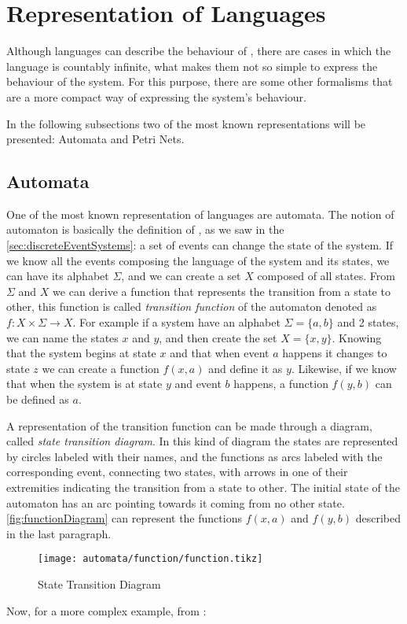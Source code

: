 \section{Representation of Languages}
\label{sec:representationLanguages}

Although languages can describe the behaviour of \DESs, there are cases in which the language is countably infinite, what makes them not so simple to express the
behaviour of the system. For this purpose, there are some other formalisms that
are a more compact way of expressing the
system's behaviour.

In the following subsections two of the most known representations will be
presented: Automata and Petri Nets.

\subsection{Automata}
\label{sec:automata}
One of the most known representation of languages are automata. The notion of
automaton is basically the definition of \DESs, as we saw in the
\autoref{sec:discreteEventSystems}: a set of events can change the state of the
system. If we know all the events composing the language of the
system and its states, we can have its alphabet $\Sigma$, and we can create a set $X$ composed
of all states.
From $\Sigma$ and $X$ we can derive a function that represents the transition
from a state to other, this function is called \emph{transition function} of the automaton
denoted as $f : X \times \Sigma \rightarrow X$. For example if a system have an
alphabet $\Sigma = \{a,b\}$ and 2 states, we can name the states $x$ and
$y$, and then create the set $X = \{x,y\}$. Knowing that the system begins at state $x$
and that when event $a$ happens it changes to state $z$ we can create a function
$f(x,a)$ and define it as $y$. Likewise, if we know that when the system is at
state $y$ and event $b$ happens, a function $f(y,b)$ can be defined as $a$.

 A representation of the transition function can be made through a diagram, called \emph{state transition diagram}. In this kind of diagram the states are
represented by circles labeled with their names, and the functions as arcs
labeled with the corresponding event, connecting two states, with arrows in one of their
extremities indicating the transition from a state to other. The initial state
of the automaton has an arc pointing towards it coming from no other state.
\autoref{fig:functionDiagram} can represent the functions $f(x,a)$ and $f(y,b)$
described in the last paragraph.
\begin{figure}[H]
  \centering
  \texttt{[image: automata/function/function.tikz]}
  \caption{State Transition Diagram}
  \label{fig:functionDiagram}
\end{figure}
Now, for a more complex example, from \cite{cassandras2009introduction}:

